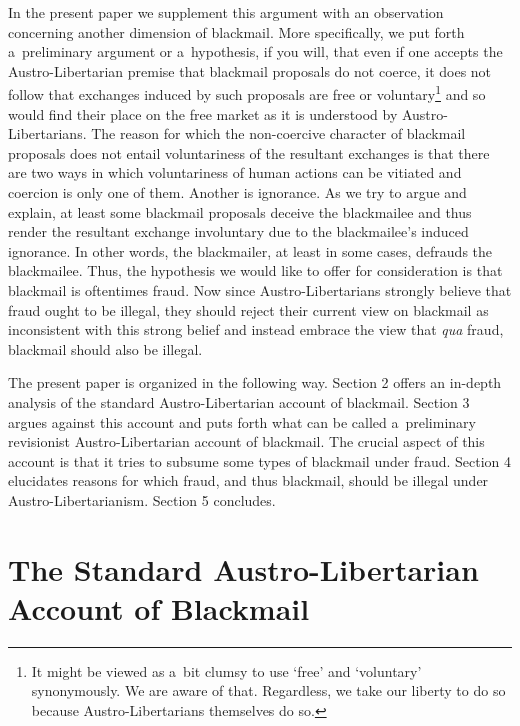 In the present paper we supplement this argument with an observation concerning another dimension of blackmail. More specifically, we put forth a~preliminary argument or a~hypothesis, if you will, that even if one accepts the Austro-Libertarian premise that blackmail proposals do not coerce, it does not follow that exchanges induced by such proposals are free or voluntary\footnote{It might be viewed as a~bit clumsy to use ‘free' and ‘voluntary' synonymously. We are aware of that. Regardless, we take our liberty to do so because Austro-Libertarians themselves do so. } and so would find their place on the free market as it is understood by Austro-Libertarians. The reason for which the non-coercive character of blackmail proposals does not entail voluntariness of the resultant exchanges is that there are two ways in which voluntariness of human actions can be vitiated and coercion is only one of them. Another is ignorance. As we try to argue and explain, at least some blackmail proposals deceive the blackmailee and thus render the resultant exchange involuntary due to the blackmailee's induced ignorance. In other words, the blackmailer, at least in some cases, defrauds the blackmailee. Thus, the hypothesis we would like to offer for consideration is that blackmail is oftentimes fraud. Now since Austro-Libertarians strongly believe that fraud ought to be illegal, they should reject their current view on blackmail as inconsistent with this strong belief and instead embrace the view that \textit{qua} fraud, blackmail should also be illegal.



The present paper is organized in the following way. Section 2 offers an in-depth analysis of the standard Austro-Libertarian account of blackmail. Section 3 argues against this account and puts forth what can be called a~preliminary revisionist Austro-Libertarian account of blackmail. The crucial aspect of this account is that it tries to subsume some types of blackmail under fraud. Section 4 elucidates reasons for which fraud, and thus blackmail, should be illegal under Austro-Libertarianism. Section 5 concludes.



\section{The Standard Austro-Libertarian Account of Blackmail}

